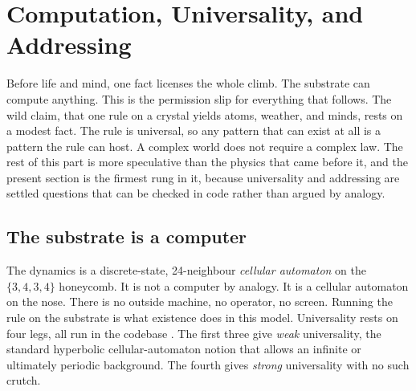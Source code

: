 \section{Computation, Universality, and Addressing}

Before life and mind, one fact licenses the whole climb. The substrate can compute anything. This is the permission slip for everything that follows. The wild claim, that one rule on a crystal yields atoms, weather, and minds, rests on a modest fact. The rule is universal, so any pattern that can exist at all is a pattern the rule can host. A complex world does not require a complex law. The rest of this part is more speculative than the physics that came before it, and the present section is the firmest rung in it, because universality and addressing are settled questions that can be checked in code rather than argued by analogy.

\subsection{The substrate is a computer}

The dynamics is a discrete-state, 24-neighbour \emph{cellular automaton} on the $\{3,4,3,4\}$ honeycomb. It is not a computer by analogy. It is a cellular automaton on the nose. There is no outside machine, no operator, no screen. Running the rule on the substrate is what existence does in this model. Universality rests on four legs, all run in the codebase \cite{pollard2026vibetest}. The first three give \emph{weak} universality, the standard hyperbolic cellular-automaton notion that allows an infinite or ultimately periodic background. The fourth gives \emph{strong} universality with no such crutch.


